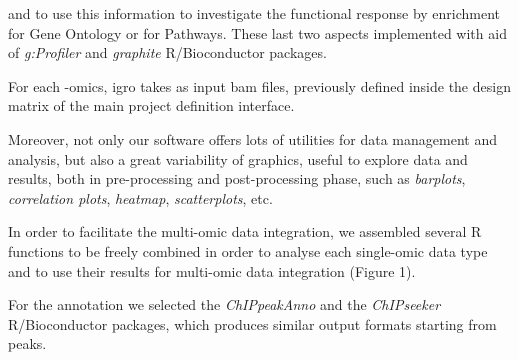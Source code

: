  and to use this information to investigate the functional response by enrichment for Gene Ontology or for Pathways.
These last two aspects implemented with aid of \textit{g:Profiler} \cite{Reimand2016} and \textit{graphite} \cite{Sales2012a} R/Bioconductor packages.


For each -omics, \gls{igro} takes as input \gls{bam} files, previously defined inside the design matrix of the main project definition interface.

Moreover, not only our software offers lots of utilities for data management and analysis, but also a great variability of graphics, useful to explore data and results, both in pre-processing and post-processing phase, such as \textit{barplots}, \textit{correlation plots}, \textit{heatmap}, \textit{scatterplots}, etc.

In order to facilitate the multi-omic data integration, we assembled several R functions to be freely combined in order to analyse each single-omic data type and to use their results for multi-omic data integration (Figure 1).

For the annotation we selected the \textit{ChIPpeakAnno} and the \textit{ChIPseeker} R/Bioconductor packages, which produces similar output formats starting from peaks.